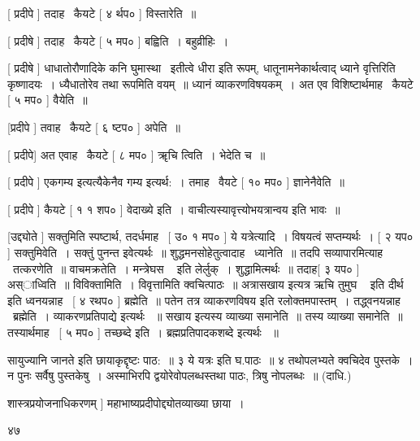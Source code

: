 \documentclass[11pt, openany]{book}
\begin{document}
 [ प्रदीपे ] तदाह \textendash\ कैयटे [ ४ र्थप० ] विस्तारेति~॥ 

 [ प्रदीषे ] तदाह \textendash\ कैयटे [ ५ मप० ] बह्विति~। बहुव्रीहिः~। 

 [ प्रदीषे ] धाधातोरौणादिके कनि घुमास्था \textendash\  इतीत्वे धीरा इति रूपम्,
धातूनामनेकार्थत्वाद् ध्याने वृत्तिरिति कृष्णादयः~। ध्यैधातोरेव तथा
रूपमिति वयम्~॥ ध्यानं व्याकरणविषयकम्~। अत एव विशिष्टार्थमाह \textendash\ कैयटे [
५ मप० ] वैयेति~॥ 

 [प्रदीपे ] तवाह \textendash\ कैयटे [ ६ ष्टप० ] अपेति~॥ 

 [ प्रदीपे] अत एवाह \textendash\ कैयटे [ ८ मप० ] ॠचि त्विति~। भेदेति च~॥ 

 [ प्रदीपे ] एकगम्य इत्यत्यैकेनैव गम्य इत्यर्थ:~। तमाह \textendash\ वैयटे [
१० मप० ] ज्ञानेनैवेति~॥ 

 [ प्रदीपे ] कैयटे [ १ १ शप० ] वेदाख्ये इति~। 
वाचीत्यस्यावृत्त्योभयत्रान्वय इति भावः~॥ 

 [उद्द्योते ] सक्तुमिति स्पष्टार्थ, तदर्धमाह \textendash\ [ उ० १ मप० ] ये
यत्रेत्यादि~। विषयत्वं सप्तम्यर्थः~। [ २ यप० ] सक्तुमिवेति~। सक्तुं
पुनन्त इवेत्यर्थः~॥ शुद्धमनसोहेतुत्वादाह \textendash\ ध्यानेति~॥ तदपि
सव्यापारमित्याह \textendash\ तत्करणेति~॥ वाचमक्रतेति~। {\qt मन्त्रेघस \textendash\ } इति लेर्लुक्~। 
शुद्धामित्मर्थः~॥ तदाह[ ३ यप० ] अस्ाध्विति~॥ विविक्तामिति~। 
विवृत्तामिति क्वचित्पाठः~॥ अत्रासखाय इत्यत्र {\qt ऋचि तुमुघ \textendash\ } इति दीर्थ इति
ध्वनयन्नाह \textendash\ [ ४ रथप० ] ब्रह्मेति~॥ पतेन तत्र व्याकरणविषय इति
रलोक्तमपास्तम्~। तद्ध्वनयन्नाह \textendash\ ब्रह्मेति~। व्याकरणप्रतिपाद्ये इत्यर्थः
~॥ सखाय इत्यस्य व्याख्या समानेति~॥ तस्य व्याख्या समानेति~॥
तस्यार्थमाह \textendash\ [ ५ मप० ] तच्छब्दे इति~। ब्रह्मप्रतिपादकशब्दे इत्यर्थः
~॥ 



{\qt सायुज्यानि जानते} इति छायाकृद्दृष्टः पाठ:~॥ ३ {\qt ये यत्रः इति घ.पाठः~॥} ४
तथोपलभ्यते क्वचिदेव पुस्तके~। न पुनः सर्वैषु पुस्तकेषु~। अस्माभिरपि
द्वयोरेवोपलब्धस्तथा पाठः, त्रिषु नोपलब्धः~॥ (दाधि.) 

शास्त्रप्रयोजनाधिकरणम् ] महाभाष्यप्रदीपोद्द्योतव्याख्या छाया~। 

 ४७
\end{document}
